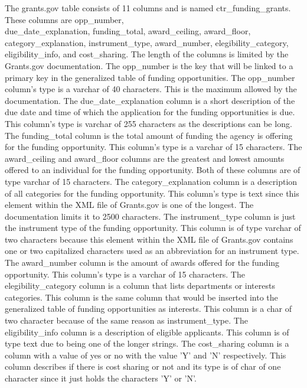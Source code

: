 \documentclass[onecolumn]{IEEEtran}
\begin{document}
The grants.gov table consists of 11 columns and is named ctr\_funding\_grants. These columns are opp\_number, \\
due\_date\_explanation, funding\_total, award\_ceiling, award\_floor, category\_explanation, instrument\_type, award\_number, elegibility\_category, eligibility\_info, and cost\_sharing.  The length of the columns is limited by the Grants.gov documentation. The opp\_number is the key that will be linked to a primary key in the generalized table of funding opportunities. The opp\_number column's type is a varchar of 40 characters. This is the maximum allowed by the documentation. The due\_date\_explanation column is a short description of the due date and time of which the application for the funding opportunities is due. This column's type is varchar of 255 characters as the descriptions can be long. The funding\_total column is the total amount of funding the agency is offering for the funding opportunity. This column's type is a varchar of 15 characters. The award\_ceiling and award\_floor columns are the greatest and lowest amounts offered to an individual for the funding opportunity. Both of these columns are of type varchar of 15 characters. The category\_explanation column is a description of all categories for the funding opportunity. This column's type is text since this element within the XML file of Grants.gov is one of the longest. The documentation limits it to 2500 characters. The instrument\_type column is just the instrument type of the funding opportunity. This column is of type varchar of two characters because this element within the XML file of Grants.gov contains one or two capitalized characters used as an abbreviation for an instrument type. The award\_number column is the amount of awards offered for the funding opportunity. This column's type is a varchar of 15 characters. The elegibility\_category column is a column that lists departments or interests categories. This column is the same column that would be inserted into the generalized table of funding opportunities as interests. This column is a char of two character because of the same reason as instrument\_type. The eligibility\_info column is a description of eligible applicants. This column is of type text due to being one of the longer strings. The cost\_sharing column is a column with a value of yes or no with the value 'Y' and 'N' respectively. This column describes if there is cost sharing or not and its type is of char of one character since it just holds the characters 'Y' or 'N'.
\end{document}

